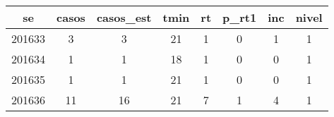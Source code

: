 \begin{tabular}{c|ccccccc}
  \hline
se & casos & casos\_est & tmin & rt & p\_rt1 & inc & nivel \\ 
  \hline
201633 & 3 & 3 & 21 & 1 & 0 & 1 & 1 \\ 
  201634 & 1 & 1 & 18 & 1 & 0 & 0 & 1 \\ 
  201635 & 1 & 1 & 21 & 1 & 0 & 0 & 1 \\ 
  201636 & 11 & 16 & 21 & 7 & 1 & 4 & 1 \\ 
   \hline
\end{tabular}
